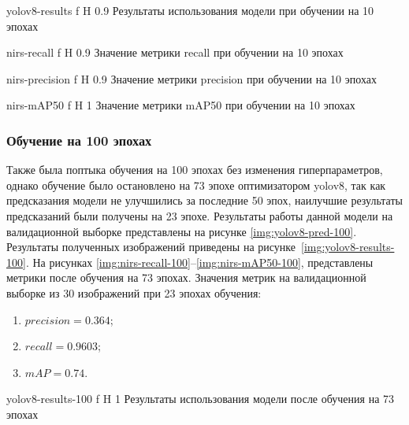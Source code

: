 {yolov8-results} %
{f} %
{H} %
{0.9\textwidth} %
{Результаты использования модели при обучении на 10 эпохах} %

{nirs-recall} %
{f} %
{H} %
{0.9\textwidth} %
{Значение метрики recall при обучении на 10 эпохах} %


{nirs-precision} %
{f} %
{H} %
{0.9\textwidth} %
{Значение метрики precision при обучении на 10 эпохах} %


{nirs-mAP50} %
{f} %
{H} %
{1\textwidth} %
{Значение метрики mAP50 при обучении на 10 эпохах} %

\subsubsection{Обучение на 100 эпохах}
\label{res:learn-100}
Также была поптыка обучения на 100 эпохах без изменения гиперпараметров, однако обучение было остановлено на 73 эпохе оптимизатором yolov8, так как предсказания модели не улучшились
за последние 50 эпох, наилучшие результаты предсказаний были получены на 23 эпохе. Результаты работы данной модели на валидационной выборке представлены на рисунке \ref{img:yolov8-pred-100}.
Результаты полученных изображений приведены на рисунке~\ref{img:yolov8-results-100}.
На рисунках \ref{img:nirs-recall-100}--\ref{img:nirs-mAP50-100}, представлены метрики после обучения на 73 эпохах.
Значения метрик  на валидационной выборке из 30 изображений при 23 эпохах обучения:
\begin{enumerate}
	\item $precision=0.364$;
	\item $recall=0.9603$;
	\item $mAP=0.74$.
\end{enumerate}


{yolov8-results-100} %
{f} %
{H} %
{1\textwidth} %
{Результаты использования модели после обучения на 73 эпохах} %

